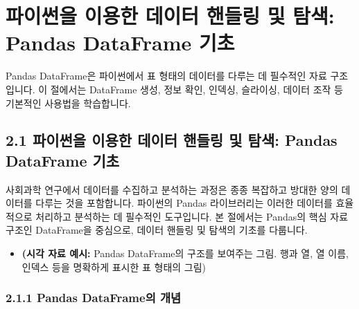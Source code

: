\documentclass[
  letterpaper,
]{book}
\providecommand{\tightlist}{%
  \setlength{\itemsep}{0pt}\setlength{\parskip}{0pt}}
\begin{document}
\chapter{파이썬을 이용한 데이터 핸들링 및 탐색: Pandas DataFrame
기초}\label{uxd30cuxc774uxc36cuxc744-uxc774uxc6a9uxd55c-uxb370uxc774uxd130-uxd578uxb4e4uxb9c1-uxbc0f-uxd0d0uxc0c9-pandas-dataframe-uxae30uxcd08}

\begin{tcolorbox}[enhanced jigsaw, breakable, rightrule=.15mm, bottomrule=.15mm, coltitle=black, colback=white, title=\textcolor{quarto-callout-note-color}{\faInfo}\hspace{0.5em}{📌 핵심 요약}, leftrule=.75mm, bottomtitle=1mm, opacityback=0, colbacktitle=quarto-callout-note-color!10!white, colframe=quarto-callout-note-color-frame, opacitybacktitle=0.6, toprule=.15mm, titlerule=0mm, arc=.35mm, toptitle=1mm, left=2mm]

Pandas DataFrame은 파이썬에서 표 형태의 데이터를 다루는 데 필수적인 자료
구조입니다. 이 절에서는 DataFrame 생성, 정보 확인, 인덱싱, 슬라이싱,
데이터 조작 등 기본적인 사용법을 학습합니다.

\end{tcolorbox}

\section{2.1 파이썬을 이용한 데이터 핸들링 및 탐색: Pandas DataFrame
기초}\label{uxd30cuxc774uxc36cuxc744-uxc774uxc6a9uxd55c-uxb370uxc774uxd130-uxd578uxb4e4uxb9c1-uxbc0f-uxd0d0uxc0c9-pandas-dataframe-uxae30uxcd08-1}

사회과학 연구에서 데이터를 수집하고 분석하는 과정은 종종 복잡하고 방대한
양의 데이터를 다루는 것을 포함합니다. 파이썬의 Pandas 라이브러리는
이러한 데이터를 효율적으로 처리하고 분석하는 데 필수적인 도구입니다. 본
절에서는 Pandas의 핵심 자료 구조인 DataFrame을 중심으로, 데이터 핸들링
및 탐색의 기초를 다룹니다.

\begin{itemize}
\tightlist
\item
  \textbf{(시각 자료 예시:} Pandas DataFrame의 구조를 보여주는 그림.
  행과 열, 열 이름, 인덱스 등을 명확하게 표시한 표 형태의 그림)
\end{itemize}

\subsection{2.1.1 Pandas DataFrame의
개념}\label{pandas-dataframeuxc758-uxac1cuxb150}
\end{document}
